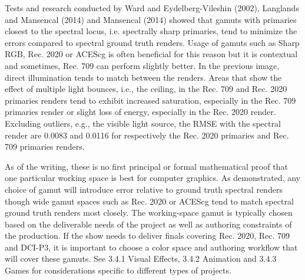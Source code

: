Tests and research conducted by Ward and Eydelberg-Vileshin (2002), Langlands and Mansencal (2014) and Mansencal (2014) showed that gamuts with primaries closest to the spectral locus, i.e. spectrally sharp primaries, tend to minimize the errors compared to spectral ground truth renders.
Usage of gamuts such as Sharp RGB, Rec. 2020 or ACEScg is often beneficial for this reason but it is contextual and sometimes, Rec. 709 can perform slightly better. In the previous image, direct illumination tends to match between the renders. Areas that show the effect of multiple light bounces, i.e., the ceiling, in the Rec. 709 and Rec. 2020 primaries renders tend to exhibit increased saturation, especially in the Rec. 709 primaries render or slight loss of energy, especially in the Rec. 2020 render. Excluding outliers, e.g., the visible light source, the RMSE with the spectral render are 0.0083 and 0.0116 for respectively the Rec. 2020 primaries and Rec. 709 primaries renders.

As of the writing, these is no first principal or formal mathematical proof that one particular working space is best for computer graphics. As demonstrated, any choice of gamut will introduce error relative to ground truth spectral renders though wide gamut spaces such as Rec. 2020 or ACEScg tend to match spectral ground truth renders most closely. The working-space gamut is typically chosen based on the deliverable needs of the project as well as authoring constraints of the production. If the show needs to deliver finals covering Rec. 2020, Rec. 709 and DCI-P3, it is important to choose a color space and authoring workflow that will cover these gamuts. See 3.4.1 Visual Effects, 3.4.2 Animation and 3.4.3 Games for considerations specific to different types of projects.


